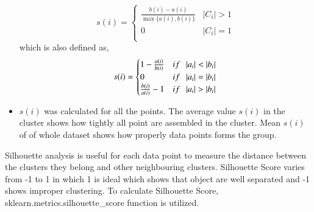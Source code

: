\documentclass[preprint,12pt]{elsarticle}
\begin{document}
\begin{itemize}
					 	\begin{equation}
				 		s(i) =
						 	\begin{cases} 
					 	 \frac{b(i) - a(i)}{\max\{a(i),b(i)\}} 	 & |C_i|  > 1 \\ 
						 	0 & |C_i|  = 1 \\
						 	\end{cases}				 			
					 	\end{equation}
					 	which is also defined as,
					 	\begin{equation}
								s(i) =
								\begin{cases} 
								 1- \frac{a(i)}{b(i)} 	 & if \hspace{0.25cm} |a_i|  < |b_i|  \\ 
								0 & if \hspace{0.25cm} |a_i|  = |b_i|  \\ 
								\frac{b(i)}{a(i)} - 1  	 & if \hspace{0.25cm} |a_i|  > |b_i|  \end{cases}		 
					 	\end{equation}
					 \item $s(i)$ was calculated for all the points. The average value $s(i)$ in the cluster shows how tightly all point are assembled in the cluster. Mean $s(i)$ of of whole dataset shows how properly data points forms the group.
					 	 
					 \end{itemize} 
					 
			 	 
					 Silhouette analysis is useful for each data point to measure the distance between the clusters they belong and other neighbouring clusters. Silhouette Score varies from -1 to 1 in which 1 is ideal which shows that object are well separated and -1 shows improper clustering. To calculate Silhouette Score, sklearn.metrics.silhouette_score function is utilized.
					 
\end{document}
